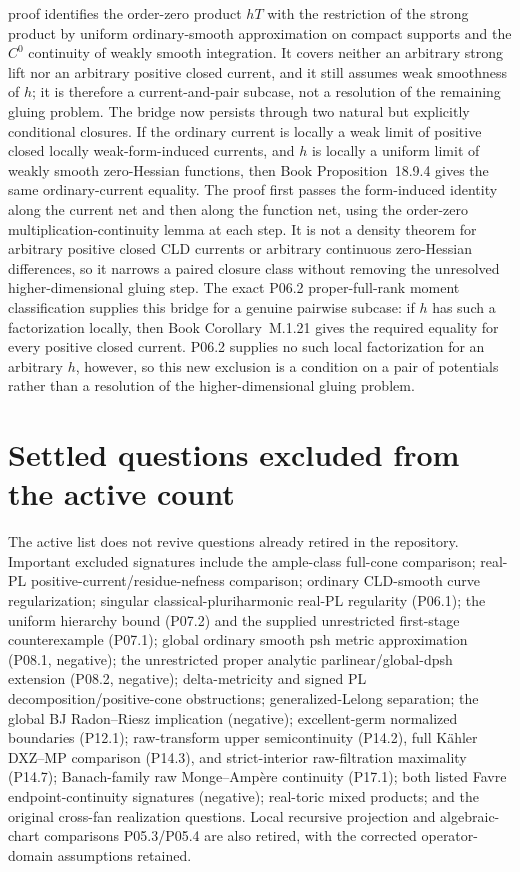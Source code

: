 \documentclass[11pt,a4paper]{article}
\theoremstyle{definition}
\theoremstyle{remark}
\begin{document}
proof identifies the order-zero product \(hT\) with the restriction of the
strong product by uniform ordinary-smooth approximation on compact supports
and the \(C^0\) continuity of weakly smooth integration.  It covers neither an
arbitrary strong lift nor an arbitrary positive closed current, and it still
assumes weak smoothness of \(h\); it is therefore a current-and-pair subcase,
not a resolution of the remaining gluing problem.
The bridge now persists through two natural but explicitly conditional
closures.  If the ordinary current is locally a weak limit of positive closed
locally weak-form-induced currents, and \(h\) is locally a uniform limit of
weakly smooth zero-Hessian functions, then
Book Proposition~18.9.4 gives the same ordinary-current
equality.  The proof first passes the form-induced identity along the current
net and then along the function net, using the order-zero
multiplication-continuity lemma at each step.  It is not a density theorem
for arbitrary positive closed CLD currents or arbitrary continuous
zero-Hessian differences, so it narrows a paired closure class without
removing the unresolved higher-dimensional gluing step.
The exact P06.2
proper-full-rank moment classification supplies this bridge for a genuine
pairwise subcase: if \(h\) has such a factorization locally, then
Book Corollary~M.1.21 gives the required equality
for every positive closed current.  P06.2 supplies no such local
factorization for an arbitrary \(h\), however, so this new exclusion is a
condition on a pair of potentials rather than a resolution of the
higher-dimensional gluing problem.

\clearpage
\section*{Settled questions excluded from the active count}
The active list does not revive questions already retired in the repository.
Important excluded signatures include the ample-class full-cone comparison;
real-PL positive-current/residue-nefness comparison; ordinary CLD-smooth
curve regularization; singular classical-pluriharmonic real-PL regularity
(P06.1); the uniform hierarchy bound (P07.2) and the supplied unrestricted
first-stage counterexample (P07.1); global ordinary smooth psh metric
approximation (P08.1, negative); the unrestricted proper analytic
parlinear/global-dpsh extension (P08.2, negative); delta-metricity and signed
PL decomposition/positive-cone obstructions; generalized-Lelong separation;
the global BJ Radon--Riesz implication (negative); excellent-germ normalized
boundaries (P12.1); raw-transform upper semicontinuity (P14.2), full
K\"ahler DXZ--MP comparison (P14.3), and strict-interior raw-filtration
maximality (P14.7); Banach-family raw Monge--Ampère continuity (P17.1);
both listed Favre endpoint-continuity signatures (negative); real-toric
mixed products; and the original cross-fan realization questions.
Local recursive projection and algebraic-chart comparisons P05.3/P05.4
are also retired, with the corrected operator-domain assumptions retained.
\end{document}
